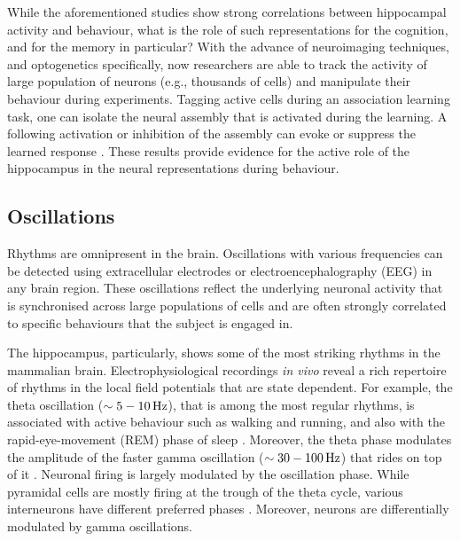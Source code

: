     While the aforementioned studies show strong correlations between
    hippocampal activity and behaviour, what is the role of such representations
    for the cognition, and for the memory in particular? With the advance of
    neuroimaging techniques, and optogenetics specifically, now researchers are
    able to track the activity of large population of neurons (e.g., thousands
    of cells) and manipulate their behaviour during experiments. Tagging active
    cells during an association learning task, one can isolate the neural
    assembly that is activated during the learning. A following activation or
    inhibition of the assembly can evoke or suppress the learned response
    \citep{Cowansage2014, Tanaka2014}. These results provide evidence for the
    active role of the hippocampus in the neural representations during
    behaviour.

  \subsection{Oscillations}
    Rhythms are omnipresent in the brain. Oscillations with various frequencies
    can be detected using extracellular electrodes or electroencephalography
    (EEG) in any brain region. These oscillations reflect the underlying
    neuronal activity that is synchronised across large populations of cells
    and are often strongly correlated to specific behaviours that the subject is
    engaged in.

    The hippocampus, particularly, shows some of the most striking rhythms in
    the mammalian brain. Electrophysiological recordings \textit{in vivo}
    reveal a rich repertoire of rhythms in the local field potentials that are
    state dependent. For example, the theta oscillation ($\sim 5-10 \rm\, Hz$),
    that is among the most regular rhythms, is associated with active behaviour
    such as walking and running, and also with the rapid-eye-movement (REM)
    phase of sleep \citep{Jung1938, Buzsaki2002}. Moreover, the theta phase
    modulates the amplitude of the faster gamma oscillation ($\sim 30-100 \rm\,
    Hz$) that rides on top of it \citep{Bragin1995, Buzsaki2002}.  Neuronal
    firing is largely modulated by the oscillation phase. While pyramidal cells
    are mostly firing at the trough of the theta cycle, various interneurons
    have different preferred phases \citep{Klausberger2008, Klausberger2009}.
    Moreover, neurons are differentially modulated by gamma oscillations.

